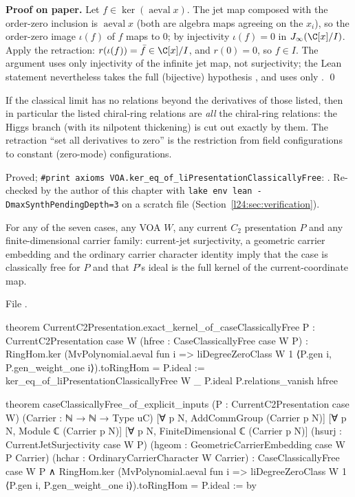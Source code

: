 \textbf{Proof on paper.} Let $f\in\ker(\operatorname{aeval}x)$. The jet map composed with the order-zero
inclusion is $\operatorname{aeval}x$ (both are algebra maps agreeing on the $x_i$), so the order-zero image
$\iota(f)$ of $f$ maps to $0$; by injectivity $\iota(f)=0$ in $\ltwentyfourJ(\C[x]/I)$. Apply the retraction:
$r(\iota(f))=\bar f\in\C[x]/I$, and $r(0)=0$, so $f\in I$. The argument uses only injectivity of the infinite jet map,
not surjectivity; the Lean statement nevertheless takes the full (bijective) hypothesis
, and uses only . \qed

\begin{physics}
If the classical limit has no relations beyond the derivatives of those listed, then in particular the
listed chiral-ring relations are \emph{all} the chiral-ring relations: the Higgs branch (with its nilpotent
thickening) is cut out exactly by them. The retraction ``set all derivatives to zero'' is the restriction
from field configurations to constant (zero-mode) configurations.
\end{physics}

\begin{status}
Proved; \texttt{\#print axioms VOA.ker\_eq\_of\_liPresentationClassicallyFree}:
. Re-checked by the author of this chapter with
\texttt{lake env lean -DmaxSynthPendingDepth=3} on a scratch file (Section~\ref{l24:sec:verification}).
\end{status}

\begin{theorem}\label{l24:thm:capstone}
For any of the seven cases, any VOA $W$, any current $C_2$ presentation $P$ and any finite-dimensional carrier
family: current-jet surjectivity, a geometric carrier embedding and the ordinary carrier character identity
imply that the case is classically free for $P$ and that $P$'s ideal is the full kernel of the
current-coordinate map.
\end{theorem}
\noindent File .
\begin{leancode}
theorem CurrentC2Presentation.exact_kernel_of_caseClassicallyFree
    {P : CurrentC2Presentation case W} (hfree : CaseClassicallyFree case W P) :
    RingHom.ker
        (MvPolynomial.aeval fun i =>
          liDegreeZeroClass W 1 ⟨P.gen i, P.gen_weight_one i⟩).toRingHom =
      P.ideal :=
  ker_eq_of_liPresentationClassicallyFree W _ P.ideal P.relations_vanish hfree

theorem caseClassicallyFree_of_explicit_inputs
    (P : CurrentC2Presentation case W)
    (Carrier : ℕ → ℕ → Type uC)
    [∀ p N, AddCommGroup (Carrier p N)]
    [∀ p N, Module ℂ (Carrier p N)]
    [∀ p N, FiniteDimensional ℂ (Carrier p N)]
    (hsurj : CurrentJetSurjectivity case W P)
    (hgeom : GeometricCarrierEmbedding case W P Carrier)
    (hchar : OrdinaryCarrierCharacter W Carrier) :
    CaseClassicallyFree case W P ∧
      RingHom.ker
          (MvPolynomial.aeval fun i =>
            liDegreeZeroClass W 1 ⟨P.gen i, P.gen_weight_one i⟩).toRingHom =
        P.ideal := by
\end{leancode}

